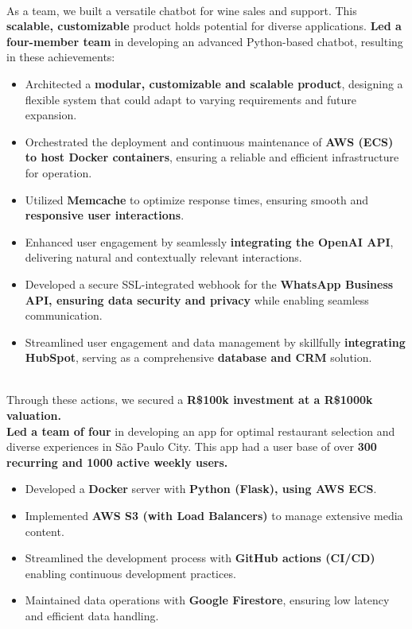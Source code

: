 
\\
As a team, we built a versatile chatbot for wine sales and support. This \textbf{scalable, customizable} product holds potential for diverse applications. \textbf{Led a four-member team} in developing an advanced Python-based chatbot, resulting in these achievements:
\begin{itemize}
  \item Architected a \textbf{modular, customizable and scalable product}, designing a flexible system that could adapt to varying requirements and future expansion.
  \item Orchestrated the deployment and continuous maintenance of \textbf{AWS (ECS) to host Docker containers}, ensuring a reliable and efficient infrastructure for operation.
  \item Utilized \textbf{Memcache} to optimize response times, ensuring smooth and \textbf{responsive user interactions}.
  \item Enhanced user engagement by seamlessly \textbf{integrating the OpenAI API}, delivering natural and contextually relevant interactions.
  \item Developed a secure SSL-integrated webhook for the \textbf{WhatsApp Business API, ensuring data security and privacy} while enabling seamless communication.
  \item Streamlined user engagement and data management by skillfully \textbf{integrating HubSpot}, serving as a comprehensive \textbf{database and CRM} solution.
\end{itemize}
\vspace{0.6em}

\\
Through these actions, we secured a \textbf{R\$100k investment at a R\$1000k valuation.}\\
\textbf{Led a team of four} in developing an app for optimal restaurant selection and diverse experiences in São Paulo City. This app had a user base of over \textbf{300 recurring and 1000 active weekly users.}
\begin{itemize}
  \item Developed a \textbf{Docker} server with \textbf{Python (Flask), using AWS ECS}.
  \item Implemented \textbf{AWS S3 (with Load Balancers)} to manage extensive media content.
  \item Streamlined the development process with \textbf{GitHub actions (CI/CD)} enabling continuous development practices.
  \item Maintained data operations with \textbf{Google Firestore}, ensuring low latency and efficient data handling. 
\end{itemize}
\vspace{0.6em}

